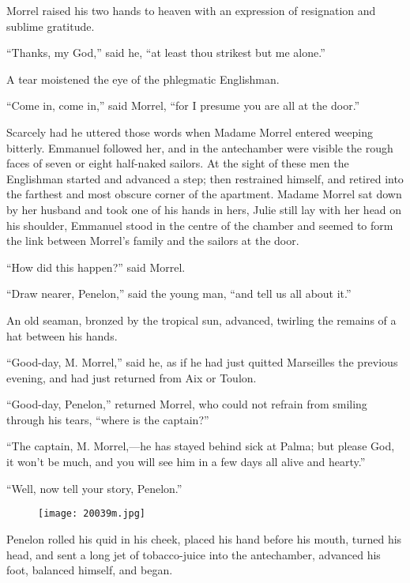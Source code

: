 Morrel raised his two hands to heaven with an expression of resignation
and sublime gratitude.

“Thanks, my God,” said he, “at least thou strikest but me alone.”

A tear moistened the eye of the phlegmatic Englishman.

“Come in, come in,” said Morrel, “for I presume you are all at the
door.”

Scarcely had he uttered those words when Madame Morrel entered weeping
bitterly. Emmanuel followed her, and in the antechamber were visible
the rough faces of seven or eight half-naked sailors. At the sight of
these men the Englishman started and advanced a step; then restrained
himself, and retired into the farthest and most obscure corner of the
apartment. Madame Morrel sat down by her husband and took one of his
hands in hers, Julie still lay with her head on his shoulder, Emmanuel
stood in the centre of the chamber and seemed to form the link between
Morrel’s family and the sailors at the door.

“How did this happen?” said Morrel.

“Draw nearer, Penelon,” said the young man, “and tell us all about it.”

An old seaman, bronzed by the tropical sun, advanced, twirling the
remains of a hat between his hands.

“Good-day, M. Morrel,” said he, as if he had just quitted Marseilles
the previous evening, and had just returned from Aix or Toulon.

“Good-day, Penelon,” returned Morrel, who could not refrain from
smiling through his tears, “where is the captain?”

“The captain, M. Morrel,—he has stayed behind sick at Palma; but please
God, it won’t be much, and you will see him in a few days all alive and
hearty.”

“Well, now tell your story, Penelon.”

\begin{figure}[ht]
\texttt{[image: 20039m.jpg]}
\end{figure}

Penelon rolled his quid in his cheek, placed his hand before his mouth,
turned his head, and sent a long jet of tobacco-juice into the
antechamber, advanced his foot, balanced himself, and began.

